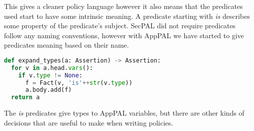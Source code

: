\documentclass[thesis.tex]{subfiles}
\begin{document}
This gives a cleaner policy language however it also means that the predicates
used start to have some intrinsic meaning.  A predicate starting with
\emph{is} describes some property of the predicate's subject.
SecPAL did not require predicates follow any naming conventions, however with
AppPAL we have started to give predicates meaning based on their name.

\begin{lstlisting}[language=Python, float, caption={Procedure used to expand types from AppPAL into SecPAL.}]
def expand_types(a: Assertion) -> Assertion:
  for v in a.head.vars():
    if v.type != None:
      f = Fact(v, 'is'++str(v.type))
      a.body.add(f)
  return a
\end{lstlisting}



The \emph{is} predicates give types to AppPAL variables, but there are other kinds of decisions that are useful to make when writing policies.
\end{document}

